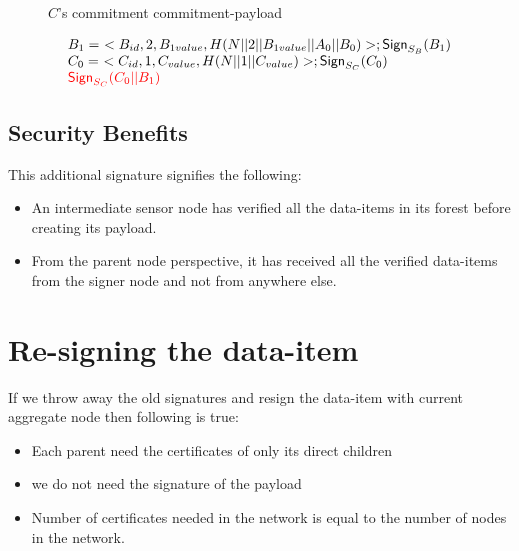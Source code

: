 \begin{exmp}
\begin{figure}[h!]
				\caption{$C$'s commitment commitment-payload}
				\label{fig:Commitment payload of C}
			\end{figure}
		\begin{equation}	
			\begin{array}{l}
				B_{1} =\ <B_{id}, 2, B_{1value}, H(N||2||B_{1value}||A_{0}||B_{0})>; \textsf{Sign}_{S_{B}}(B_{1})\\
				C_{0} =\ <C_{id}, 1, C_{value}, H(N||1||C_{value})>; \textsf{Sign}_{S_{C}}(C_{0})\\
				\textcolor{red}{\textsf{Sign}_{S_{C}}(C_{0}||B_{1})}
			\end{array}
		\end{equation}
	\end{exmp}
	\subsection{Security Benefits}

	This additional signature signifies the following:
	\begin{itemize}
		\item	An intermediate sensor node has verified all the data-items in its forest before creating its payload.
		\item From the parent node perspective, it has received all the verified data-items from the signer node and not from anywhere else.
	\end{itemize}

	\section{Re-signing the data-item}
		If we throw away the old signatures and resign the data-item with current aggregate node then following is true:
			\begin{itemize}
				\item Each parent need the certificates of only its direct children
				\item we do not need the signature of the payload
				\item Number of certificates needed in the network is equal to the number of nodes in the network.
			\end{itemize}

